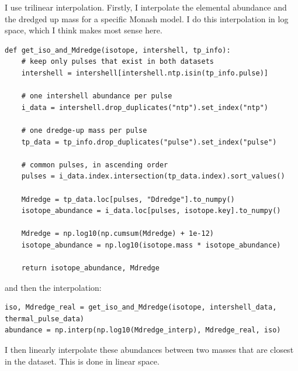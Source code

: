 \documentclass[a4paper,10pt]{article}
\begin{document}
\begin{figure}[ht]
    \centering
\end{figure}


I use trilinear interpolation. Firstly, I interpolate the elemental abundance and the dredged up mass for a specific Monash model.
I do this interpolation in log space, which I think makes most sense here.

\begin{verbatim}
def get_iso_and_Mdredge(isotope, intershell, tp_info):
    # keep only pulses that exist in both datasets
    intershell = intershell[intershell.ntp.isin(tp_info.pulse)]

    # one intershell abundance per pulse
    i_data = intershell.drop_duplicates("ntp").set_index("ntp")

    # one dredge-up mass per pulse
    tp_data = tp_info.drop_duplicates("pulse").set_index("pulse")

    # common pulses, in ascending order
    pulses = i_data.index.intersection(tp_data.index).sort_values()

    Mdredge = tp_data.loc[pulses, "Ddredge"].to_numpy()
    isotope_abundance = i_data.loc[pulses, isotope.key].to_numpy()

    Mdredge = np.log10(np.cumsum(Mdredge) + 1e-12)
    isotope_abundance = np.log10(isotope.mass * isotope_abundance)

    return isotope_abundance, Mdredge
\end{verbatim}
and then the interpolation:
\begin{verbatim}
iso, Mdredge_real = get_iso_and_Mdredge(isotope, intershell_data, thermal_pulse_data)
abundance = np.interp(np.log10(Mdredge_interp), Mdredge_real, iso)
\end{verbatim}

I then linearly interpolate these abundances between two masses that are closest in the dataset.
This is done in linear space.
\end{document}
